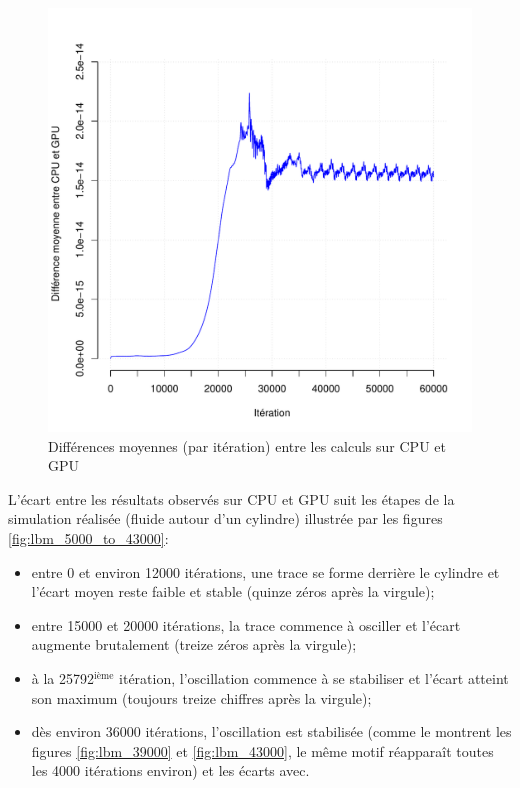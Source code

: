 \begin{figure}[H]
	\centering
	\includegraphics[scale=0.87, fbox]{../data/lbm_cpu_vs_gpu/deltas/Rplots.pdf}
	\caption{Différences moyennes (par itération) entre les calculs sur \acs{CPU} et \acs{GPU}}
	\label{fig:lbm_float_deltas}
\end{figure}

L'écart entre les résultats observés sur \ac{CPU} et \ac{GPU} suit les étapes de la simulation réalisée (fluide autour d'un cylindre) illustrée par les figures \ref{fig:lbm_5000_to_43000}:
\begin{itemize}
	\item entre 0 et environ 12000 itérations, une trace se forme derrière le cylindre et l'écart moyen reste faible et stable (quinze zéros après la virgule);
	\item entre 15000 et 20000 itérations, la trace commence à osciller et l'écart augmente brutalement (treize zéros après la virgule);
	\item à la 25792$^{\textrm{ième}}$ itération, l'oscillation commence à se stabiliser et l'écart atteint son maximum (toujours treize chiffres après la virgule);
	\item dès environ 36000 itérations, l'oscillation est stabilisée (comme le montrent les figures \ref{fig:lbm_39000} et \ref{fig:lbm_43000}, le même motif réapparaît toutes les 4000 itérations environ) et les écarts avec.
\end{itemize}

